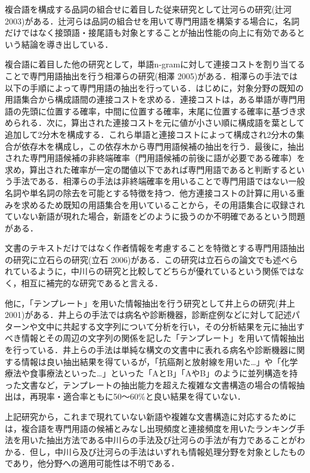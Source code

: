 \documentclass[japanese]{jnlp_1.4}
\begin{document}
複合語を構成する品詞の組合せに着目した従来研究として辻河らの研究(辻河 2003)がある．辻河らは品詞の組合せを用いて専門用語を構築する場合に，名詞だけではなく接頭語・接尾語も対象とすることが抽出性能の向上に有効であるという結論を導き出している．

複合語に着目した他の研究として，単語n-gramに対して連接コストを割り当てることで専門用語抽出を行う相澤らの研究(相澤 2005)がある．相澤らの手法では以下の手順によって専門用語の抽出を行っている．はじめに，対象分野の既知の用語集合から構成語間の連接コストを求める．連接コストは，ある単語が専門用語の先頭に位置する確率，中間に位置する確率，末尾に位置する確率に基づき求められる．次に，算出された連接コストを元に値が小さい順に構成語を葉として追加して2分木を構成する．これら単語と連接コストによって構成され2分木の集合が依存木を構成し，この依存木から専門用語候補の抽出を行う．最後に，抽出された専門用語候補の非終端確率（門用語候補の前後に語が必要である確率）を求め，算出された確率が一定の閾値以下であれば専門用語であると判断するという手法である．相澤らの手法は非終端確率を用いることで専門用語ではない一般名詞や単名詞の除去を可能とする特徴を持つ．他方連接コストの計算に用いる重みを求めるため既知の用語集合を用いていることから，その用語集合に収録されていない新語が現れた場合，新語をどのように扱うのか不明確であるという問題がある．

文書のテキストだけではなく作者情報を考慮することを特徴とする専門用語抽出の研究に立石らの研究(立石 2006)がある．この研究は立石らの論文でも述べられているように，中川らの研究と比較してどちらが優れているという関係ではなく，相互に補完的な研究であると言える．

他に，「テンプレート」を用いた情報抽出を行う研究として井上らの研究(井上 2001)がある．井上らの手法では病名や診断機器，診断症例などに対して記述パターンや文中に共起する文字列について分析を行い，その分析結果を元に抽出すべき情報とその周辺の文字列の関係を記した「テンプレート」を用いて情報抽出を行っている．井上らの手法は単純な構文の文書中に表れる病名や診断機器に関する情報は良い抽出結果を得ているが，「抗癌剤と放射線を用いた…」や「化学療法や食事療法といった…」といった「AとB」「AやB」のように並列構造を持った文書など，テンプレートの抽出能力を超えた複雑な文書構造の場合の情報抽出は，再現率・適合率ともに50〜60{\%}と良い結果を得ていない．

上記研究から，これまで現れていない新語や複雑な文書構造に対応するためには，複合語を専門用語の候補とみなし出現頻度と連接頻度を用いたランキング手法を用いた抽出方法である中川らの手法及び辻河らの手法が有力であることがわかる．但し，中川ら及び辻河らの手法はいずれも情報処理分野を対象としたものであり，他分野への適用可能性は不明である．
\end{document}
